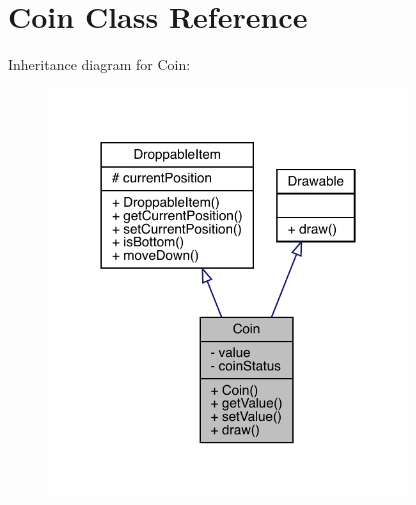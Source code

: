 \hypertarget{class_coin}{}\section{Coin Class Reference}
\label{class_coin}


Inheritance diagram for Coin\+:
\nopagebreak
\begin{figure}[H]
\begin{center}
\leavevmode
\includegraphics[width=270pt]{class_coin__inherit__graph}
\end{center}
\end{figure}


